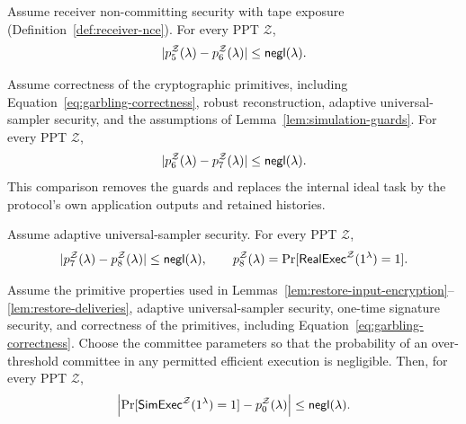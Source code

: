 \begin{lemma}
\label{lem:restore-deliveries}
Assume receiver non-committing security with tape exposure
(Definition~\ref{def:receiver-nce}).  For every PPT $\mathcal Z$,
\[
 |p_5^{\mathcal Z}(\lambda)-p_6^{\mathcal Z}(\lambda)|
 \leq\mathop{\mathsf{negl}}(\lambda).
\]
\end{lemma}

\begin{lemma}
\label{lem:remove-ideal-bookkeeping}
Assume correctness of the cryptographic primitives, including
Equation~\eqref{eq:garbling-correctness},
robust reconstruction, adaptive universal-sampler security, and the assumptions of
Lemma~\ref{lem:simulation-guards}.  For every PPT $\mathcal Z$,
\[
 |p_6^{\mathcal Z}(\lambda)-p_7^{\mathcal Z}(\lambda)|
 \leq\mathop{\mathsf{negl}}(\lambda).
\]
This comparison removes the guards and replaces the internal ideal task
by the protocol's own application outputs and retained histories.
\end{lemma}

\begin{lemma}
\label{lem:restore-public-sampling}
Assume adaptive universal-sampler security.  For every PPT $\mathcal Z$,
\[
 |p_7^{\mathcal Z}(\lambda)-p_8^{\mathcal Z}(\lambda)|
 \leq\mathop{\mathsf{negl}}(\lambda),
 \qquad
 p_8^{\mathcal Z}(\lambda)=\Pr[\mathsf{RealExec}^{\mathcal Z}(1^\lambda)=1].
\]
\end{lemma}

\begin{lemma}
\label{lem:simulation-guards}
Assume the primitive properties used in
Lemmas~\ref{lem:restore-input-encryption}--\ref{lem:restore-deliveries},
adaptive universal-sampler security, one-time signature security, and
correctness of the primitives, including
Equation~\eqref{eq:garbling-correctness}.
Choose the committee parameters so that the
probability of an over-threshold committee in any permitted efficient
execution is negligible.  Then, for every PPT $\mathcal Z$,
\[
 \left|\Pr[\mathsf{SimExec}^{\mathcal Z}(1^\lambda)=1]
             -p_0^{\mathcal Z}(\lambda)\right|\leq\mathop{\mathsf{negl}}(\lambda).
\]
\end{lemma}

